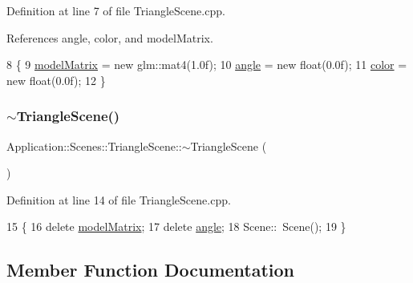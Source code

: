 Definition at line 7 of file Triangle\+Scene.\+cpp.



References angle, color, and model\+Matrix.


\begin{DoxyCode}
8 \{
9     \mbox{\hyperlink{classApplication_1_1Scenes_1_1TriangleScene_a2c270015fd60f4aeb281474ddfdcd692}{modelMatrix}} = \textcolor{keyword}{new} glm::mat4(1.0f);
10     \mbox{\hyperlink{classApplication_1_1Scenes_1_1TriangleScene_a398daba41c0317ccb019d714bec0c795}{angle}} = \textcolor{keyword}{new} float(0.0f);
11     \mbox{\hyperlink{classApplication_1_1Scenes_1_1TriangleScene_ab5d8bb91e423f50a7c54979853cfcbc9}{color}} = \textcolor{keyword}{new} float(0.0f);
12 \}
\end{DoxyCode}
\mbox{\label{classApplication_1_1Scenes_1_1TriangleScene_a5b1166cd574db6efeea5de8029672437}} 
\subsubsection{\texorpdfstring{$\sim$\+Triangle\+Scene()}{~TriangleScene()}}
{\footnotesize\ttfamily Application\+::\+Scenes\+::\+Triangle\+Scene\+::$\sim$\+Triangle\+Scene (\begin{DoxyParamCaption}{ }\end{DoxyParamCaption})}



Definition at line 14 of file Triangle\+Scene.\+cpp.


\begin{DoxyCode}
15 \{
16     \textcolor{keyword}{delete} \mbox{\hyperlink{classApplication_1_1Scenes_1_1TriangleScene_a2c270015fd60f4aeb281474ddfdcd692}{modelMatrix}};
17     \textcolor{keyword}{delete} \mbox{\hyperlink{classApplication_1_1Scenes_1_1TriangleScene_a398daba41c0317ccb019d714bec0c795}{angle}};
18     Scene::~Scene();
19 \}
\end{DoxyCode}


\subsection{Member Function Documentation}
\mbox{\label{classEngine_1_1Components_1_1Scene_af18bd334fe66952b8d79b8e9e99ab2d8}} 
